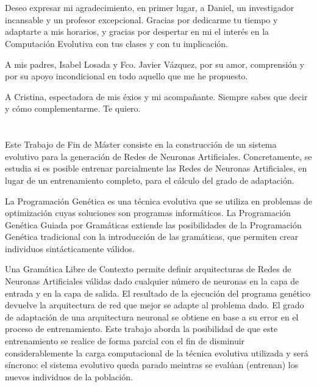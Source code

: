 \documentclass[spanish,a4paper,12pt,twoside]{report}
\begin{document}
  \chapter*{\vspace{-3cm}{\LARGE Agradecimientos}}
  \vspace{-1cm}
    Deseo expresar mi agradecimiento, en primer lugar, a Daniel, un investigador incansable y un profesor excepcional. Gracias por dedicarme tu tiempo y adaptarte a mis horarios, y gracias por despertar en mi el interés en la Computación Evolutiva con tus clases y con tu implicación.\par
    A mis padres, Isabel Losada y Fco. Javier Vázquez, por su amor, comprensión y por su apoyo incondicional en todo aquello que me he propuesto.\par
    A Cristina, espectadora de mis éxios y mi acompañante. Siempre sabes que decir y cómo complementarme. Te quiero.
  \vfill
  \newpage\cleardoublepage
  
  \chapter*{\vspace{-3cm}{\LARGE Resumen}}
  \vspace{-1cm}
  Este Trabajo de Fin de Máster consiste en la construcción de un sistema evolutivo para la generación de Redes de Neuronas Artificiales. Concretamente, se estudia si es posible entrenar parcialmente las Redes de Neuronas Artificiales, en lugar de un entrenamiento completo, para el cálculo del grado de adaptación. \par
  La Programación Genética es una técnica evolutiva que se utiliza en problemas de optimización cuyas soluciones son programas informáticos. La Programación Genética Guiada por Gramáticas extiende las posibilidades de la Programación Genética tradicional con la introducción de las gramáticas, que permiten crear individuos sintácticamente válidos. \par
  Una Gramática Libre de Contexto permite definir arquitecturas de Redes de Neuronas Artificiales válidas dado cualquier número de neuronas en la capa de entrada y en la capa de salida. El resultado de la ejecución del programa genético devuelve la arquitectura de red que mejor se adapte al problema dado. El grado de adaptación de una arquitectura neuronal se obtiene en base a su error en el proceso de entrenamiento. Este trabajo aborda la posibilidad de que este entrenamiento se realice de forma parcial con el fin de disminuir considerablemente la carga computacional de la técnica evolutiva utilizada y será síncrono: el sistema evolutivo queda parado meintras se evalúan (entrenan) los nuevos individuos de la población. \vfill
  \newpage\cleardoublepage
  
\end{document}
